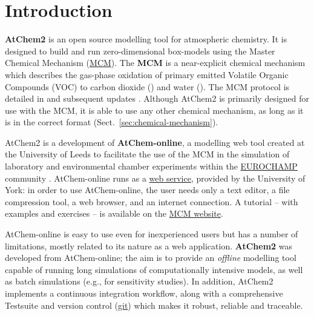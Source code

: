 %
%
%
%

\chapter{Introduction} \label{ch:introduction}

\textbf{AtChem2} is an open source modelling tool for atmospheric
chemistry. It is designed to build and run zero-dimensional
box-models using the Master Chemical Mechanism
(\href{https://mcm.york.ac.uk/MCM}{MCM}). The \textbf{MCM} is a
near-explicit chemical mechanism which describes the gas-phase
oxidation of primary emitted Volatile Organic Compounds (VOC) to
carbon dioxide () and water (). The MCM protocol is
detailed in \citet{jenkin_1997} and subsequent updates
\citep{saunders_2003, jenkin_2003, bloss_2005, jenkin_2012, jenkin_2015}.
Although AtChem2 is primarily designed for use with the MCM, it is
able to use any other chemical mechanism, as long as it is in the
correct format (Sect.~\ref{sec:chemical-mechanism}).

AtChem2 is a development of \textbf{AtChem-online}, a modelling web
tool created at the University of Leeds to facilitate the use of the
MCM in the simulation of laboratory and environmental chamber
experiments within the \href{https://www.eurochamp.org}{EUROCHAMP}
community \citep{martin_2009}. AtChem-online runs as a
\href{https://atchem.york.ac.uk}{web service}, provided by the
University of York: in order to use AtChem-online, the user needs only
a text editor, a file compression tool, a web browser, and an internet
connection. A tutorial -- with examples and exercises -- is available on
the \href{https://mcm.york.ac.uk/MCM/atchemonline/intro}{MCM website}.

AtChem-online is easy to use even for inexperienced users but has a
number of limitations, mostly related to its nature as a web
application. \textbf{AtChem2} was developed from AtChem-online; the
aim is to provide an \emph{offline} modelling tool capable of running
long simulations of computationally intensive models, as well as batch
simulations (e.g., for sensitivity studies). In addition, AtChem2
implements a continuous integration workflow, along with a comprehensive
Testsuite and version control (\href{https://git-scm.com}{git})
which makes it robust, reliable and traceable.

